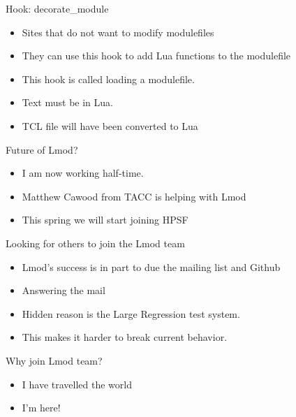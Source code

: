 \documentclass{beamer}
\begin{document}
\begin{frame}{Hook: decorate\_module}
  \begin{itemize}
    \item Sites that do not want to modify modulefiles
    \item They can use this hook to add Lua functions to the modulefile
    \item This hook is called loading a modulefile.
    \item Text must be in Lua.  
    \item TCL file will have been converted to Lua
  \end{itemize}
\end{frame}

\begin{frame}{Future of Lmod?}
  \begin{itemize}
    \item I am now working half-time.
    \item Matthew Cawood from TACC is helping with Lmod
    \item This spring we will start joining HPSF
  \end{itemize}
\end{frame}

\begin{frame}{Looking for others to join the Lmod team}
  \begin{itemize}
    \item Lmod's success is in part to due the mailing list and Github
    \item Answering the mail
    \item Hidden reason is the Large Regression test system.
    \item This makes it harder to break current behavior.
  \end{itemize}
\end{frame}

\begin{frame}{Why join Lmod team?}
  \begin{itemize}
    \item I have travelled the world
    \item I'm here!
  \end{itemize}
\end{frame}
\end{document}
